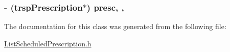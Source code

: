 \subsubsection[{presc}]{\setlength{\rightskip}{0pt plus 5cm}-\/ (trsp\+Prescription$\ast$) presc\hspace{0.3cm}{\ttfamily [read]}, {\ttfamily [write]}, {\ttfamily [atomic]}}\label{interface_list_scheduled_prescription_a68dd72c38108b398acd9b3ce600d767a}


The documentation for this class was generated from the following file\+:\begin{DoxyCompactItemize}
\item 
\hyperlink{_list_scheduled_prescription_8h}{List\+Scheduled\+Prescription.\+h}\end{DoxyCompactItemize}
